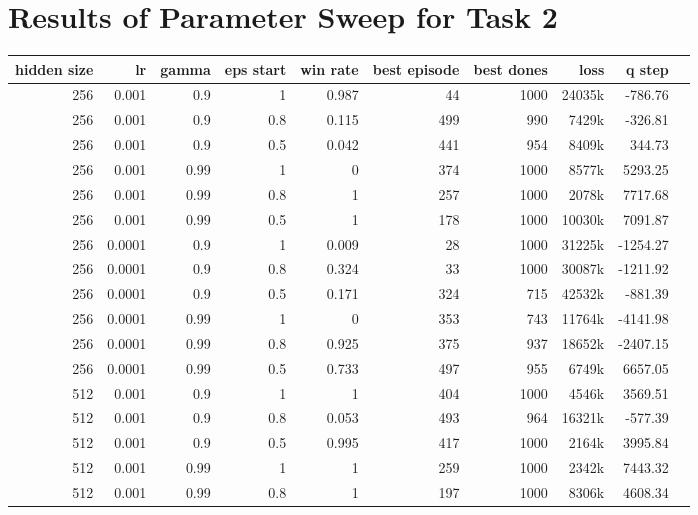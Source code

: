 \renewcommand{\topfraction}{1}
\renewcommand{\bottomfraction}{1}
\renewcommand{\textfraction}{0}
\renewcommand{\floatpagefraction}{1}

\renewcommand{\thesection}{Appendix B}
\section{Results of Parameter Sweep for Task 2}
\label{param_sweep_result_appendix}

\begin{table}[h]
	\centering
	\scriptsize
	\begin{tabular}{r r r r | r r r r r r}
		\toprule
			hidden size & lr & gamma & eps start & win rate & best episode & best dones & loss & q step \\
		\midrule
			256 & 0.001 & 0.9 & 1 & 0.987 & 44 & 1000 & 24035k & -786.76 \\
			256 & 0.001 & 0.9 & 0.8 & 0.115 & 499 & 990 & 7429k & -326.81 \\
			256 & 0.001 & 0.9 & 0.5 & 0.042 & 441 & 954 & 8409k & 344.73 \\
			256 & 0.001 & 0.99 & 1 & 0 & 374 & 1000 & 8577k & 5293.25 \\
			256 & 0.001 & 0.99 & 0.8 & 1 & 257 & 1000 & 2078k & 7717.68 \\
			256 & 0.001 & 0.99 & 0.5 & 1 & 178 & 1000 & 10030k & 7091.87 \\
			256 & 0.0001 & 0.9 & 1 & 0.009 & 28 & 1000 & 31225k & -1254.27 \\
			256 & 0.0001 & 0.9 & 0.8 & 0.324 & 33 & 1000 & 30087k & -1211.92 \\
			256 & 0.0001 & 0.9 & 0.5 & 0.171 & 324 & 715 & 42532k & -881.39 \\
			256 & 0.0001 & 0.99 & 1 & 0 & 353 & 743 & 11764k & -4141.98 \\
			256 & 0.0001 & 0.99 & 0.8 & 0.925 & 375 & 937 & 18652k & -2407.15 \\
			256 & 0.0001 & 0.99 & 0.5 & 0.733 & 497 & 955 & 6749k & 6657.05 \\
			512 & 0.001 & 0.9 & 1 & 1 & 404 & 1000 & 4546k & 3569.51 \\
			512 & 0.001 & 0.9 & 0.8 & 0.053 & 493 & 964 & 16321k & -577.39 \\
			512 & 0.001 & 0.9 & 0.5 & 0.995 & 417 & 1000 & 2164k & 3995.84 \\
			512 & 0.001 & 0.99 & 1 & 1 & 259 & 1000 & 2342k & 7443.32 \\
			512 & 0.001 & 0.99 & 0.8 & 1 & 197 & 1000 & 8306k & 4608.34 \\

\end{tabular}
\end{table}
